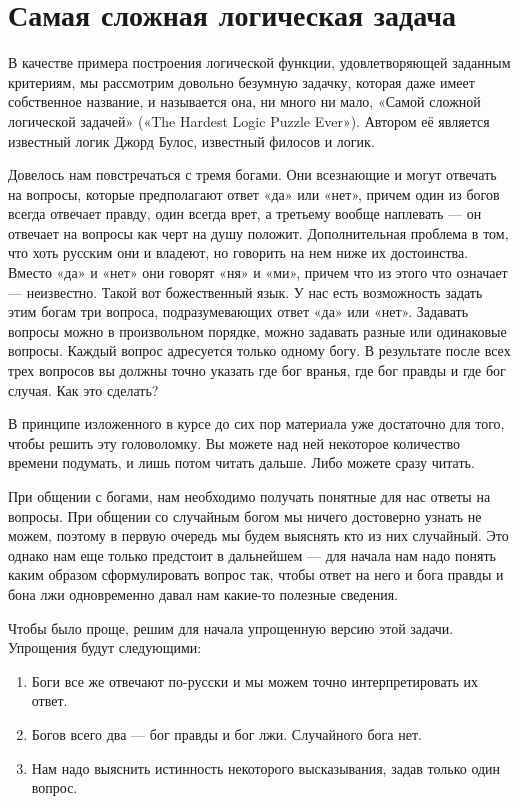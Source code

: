 \section{Самая сложная логическая задача}

В качестве примера построения логической функции, удовлетворяющей заданным критериям, мы рассмотрим довольно безумную задачку, которая даже имеет собственное название, и называется она, ни много ни мало, «Самой сложной логической задачей» («The Hardest Logic Puzzle Ever»). Автором её является известный логик Джорд Булос, известный филосов и логик.

\begin{problem}Довелось нам повстречаться с тремя богами. Они всезнающие и могут отвечать на вопросы, которые предполагают ответ «да» или «нет», причем один из богов всегда отвечает правду, один всегда врет, а третьему вообще наплевать — он отвечает на вопросы как черт на душу положит. Дополнительная проблема в том, что хоть русским они и владеют, но говорить на нем ниже их достоинства. Вместо «да» и «нет» они говорят «ня» и «ми», причем что из этого что означает — неизвестно. Такой вот божественный язык. У нас есть возможность задать этим богам три вопроса, подразумевающих ответ «да» или «нет». Задавать вопросы можно в произвольном порядке, можно задавать разные или одинаковые вопросы. Каждый вопрос адресуется только одному богу. В результате после всех трех вопросов вы должны точно указать где бог вранья, где бог правды и где бог случая. Как это сделать?\end{problem}

В принципе изложенного в курсе до сих пор материала уже достаточно для того, чтобы решить эту головоломку. Вы можете над ней некоторое количество времени подумать, и лишь потом читать дальше. Либо можете сразу читать.

При общении с богами, нам необходимо получать понятные для нас ответы на вопросы. При общении со случайным богом мы ничего достоверно узнать не можем, поэтому в первую очередь мы будем выяснять кто из них случайный. Это однако нам еще только предстоит в дальнейшем — для начала нам надо понять каким образом сформулировать вопрос так, чтобы ответ на него и бога правды и бона лжи одновременно давал нам какие-то полезные сведения.

Чтобы было проще, решим для начала упрощенную версию этой задачи. Упрощения будут следующими:

\begin{enumerate}
\item Боги все же отвечают по-русски и мы можем точно интерпретировать их ответ.
\item Богов всего два — бог правды и бог лжи. Случайного бога нет.
\item Нам надо выяснить истинность некоторого высказывания, задав только один вопрос.
\end{enumerate}

